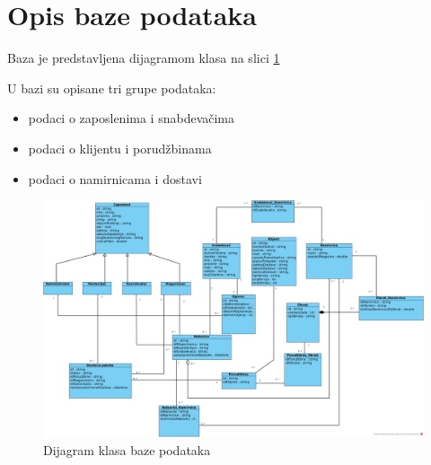 \section{\bfseries Opis baze podataka}
\label{sec:database}
Baza je predstavljena dijagramom klasa na slici \ref{fig:ClassDiagramDatabase}

U bazi su opisane tri grupe podataka:
\begin{itemize}
    \item podaci o zaposlenima i snabdevačima
    \item podaci o klijentu i porudžbinama
    \item podaci o namirnicama i dostavi
\end{itemize}





\begin{figure}[H]
	\begin{center}
		\includegraphics[width=\textwidth]{Pictures/class_diagram_database.jpg}
    		\caption{Dijagram klasa baze podataka}
    \label{fig:ClassDiagramDatabase}
    \end{center}
\end{figure}

	